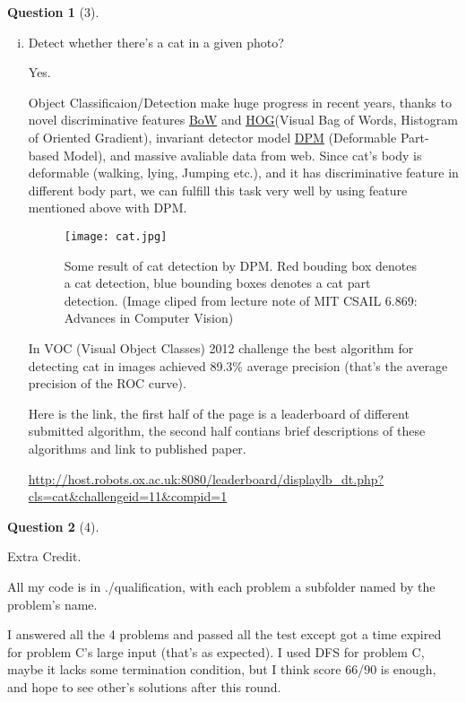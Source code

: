 \documentclass{article}
\theoremstyle{quest}
\newtheorem*{question}{Question}
\begin{document}
\begin{question}[3]
\end{question}
\begin{enumerate}[viii.]
\item
Detect whether there's a cat in a given photo?

Yes. 

Object Classificaion/Detection make huge progress in recent years, thanks to novel discriminative features \href{ourses.northwestern.edu/webapps/portal/frameset.jsp}{BoW} and \href{http://lear.inrialpes.fr/people/triggs/pubs/Dalal-cvpr05.pdf}{HOG}(Visual Bag of Words, Histogram of Oriented Gradient), invariant detector model \href{http://www.cs.berkeley.edu/~rbg/latent/}{DPM} (Deformable Part-based Model), and massive avaliable data from web. Since cat's body is deformable (walking, lying, Jumping etc.), and it has discriminative feature in different body part, we can fulfill this task very well by using feature mentioned above with DPM.

\begin{figure}[htb!]
\centering
\texttt{[image: cat.jpg]}
\caption{Some result of cat detection by DPM. Red bouding box denotes a cat detection, blue bounding boxes denotes a cat part detection. (Image cliped from lecture note of MIT CSAIL 6.869: Advances in Computer Vision)}
\end{figure}

In VOC (Visual Object Classes) 2012 challenge the best algorithm for detecting cat in images achieved 89.3\% average precision (that's the average precision of the ROC curve). 

Here is the link, the first half of the page is a leaderboard of different submitted algorithm, the second half contians brief descriptions of these algorithms and link to published paper.

\url{http://host.robots.ox.ac.uk:8080/leaderboard/displaylb_dt.php?cls=cat&challengeid=11&compid=1}



\end{enumerate}
\begin{question}[4]
\end{question}
Extra Credit.

All my code is in ./qualification, with each problem a subfolder named by the problem's name.

I answered all the 4 problems and passed all the test except got a time expired for problem C's large input (that's as expected). I used DFS for problem C, maybe it lacks some termination condition, but I think score 66/90 is enough, and hope to see other's solutions after this round.
\end{document}
